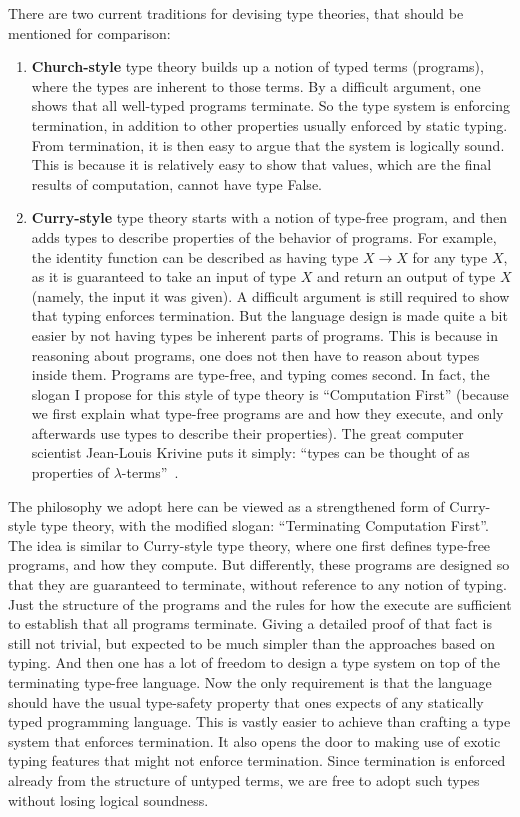 \documentclass{article}
\begin{document}
There are two current traditions for devising type theories, that
should be mentioned for comparison:

\begin{enumerate}
\item \textbf{Church-style} type theory builds up a notion of typed
  terms (programs), where the types are inherent to those terms.  By a
  difficult argument, one shows that all well-typed programs
  terminate.  So the type system is enforcing termination, in addition
  to other properties usually enforced by static typing.  From
  termination, it is then easy to argue that the system is logically
  sound.  This is because it is relatively easy to show that values,
  which are the final results of computation, cannot have type False.

\item \textbf{Curry-style} type theory starts with a notion of
  type-free program, and then adds types to describe properties of the
  behavior of programs.  For example, the identity function can be
  described as having type $X \to X$ for any type $X$, as it is
  guaranteed to take an input of type $X$ and return an output of type
  $X$ (namely, the input it was given).  A difficult argument is still
  required to show that typing enforces termination.  But the language
  design is made quite a bit easier by not having types be inherent
  parts of programs.  This is because in reasoning about programs,
  one does not then have to reason about types inside them.  Programs
  are type-free, and typing comes second.  In fact, the slogan I propose
  for this style of type theory is ``Computation First'' (because we
  first explain what type-free programs are and how they execute, and
  only afterwards use types to describe their properties).  The great
  computer scientist Jean-Louis Krivine puts it simply: ``types can
  be thought of as properties of $\lambda$-terms''~\cite[page 43]{krivine93}.
\end{enumerate}

The philosophy we adopt here can be viewed as a strengthened form of
Curry-style type theory, with the modified slogan: ``Terminating
Computation First''.  The idea is similar to Curry-style type theory,
where one first defines type-free programs, and how they compute.  But
differently, these programs are designed so that they are guaranteed
to terminate, without reference to any notion of typing.  Just the
structure of the programs and the rules for how the execute are
sufficient to establish that all programs terminate.  Giving a
detailed proof of that fact is still not trivial, but expected to be
much simpler than the approaches based on typing.  And then one has a
lot of freedom to design a type system on top of the terminating
type-free language.  Now the only requirement is that the language
should have the usual type-safety property that ones expects of any
statically typed programming language. This is vastly easier to
achieve than crafting a type system that enforces termination.  It
also opens the door to making use of exotic typing features that might
not enforce termination.  Since termination is enforced already from
the structure of untyped terms, we are free to adopt such types
without losing logical soundness.
\end{document}
